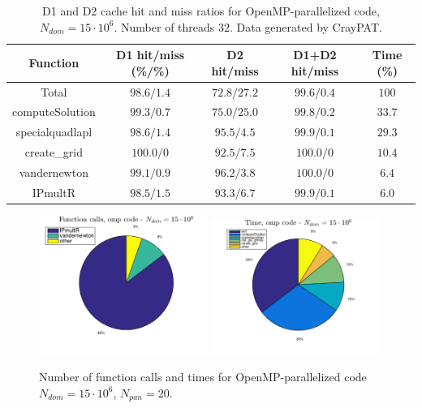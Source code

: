 \documentclass[a4paper,10pt]{article}
\begin{document}
\begin{table}[ht]
\begin{center}
    \begin{tabular}{ c | c | c | c | c }
        Function & D1 hit/miss (\%/\%) & D2 hit/miss & D1+D2 hit/miss & Time (\%) \\ \hline
        Total & $98.6/1.4$ & $72.8/27.2$ & $99.6/0.4$ & $100$ \\ 
        computeSolution & $99.3/0.7$ & $75.0/25.0$ & $99.8/0.2$ & $33.7$ \\
        specialquadlapl & $98.6/1.4$ & $95.5/4.5$ & $99.9/0.1$ & $29.3$ \\
        create\_grid & $100.0/0$ & $92.5/7.5$ & $100.0/0$ & $10.4$ \\
        vandernewton & $99.1/0.9$ & $96.2/3.8$ & $100.0/0$ & $6.4$ \\
        IPmultR & $98.5/1.5$ & $93.3/6.7$ & $99.9/0.1$ & $6.0$
    \end{tabular}
    \caption{D1 and D2 cache hit and miss ratios for OpenMP-parallelized code, $N_{dom} = 15\cdot10^6$. Number of threads $32$. Data generated by CrayPAT.}
    \label{tab:openmp_caches}
\end{center}
\end{table} 
\begin{figure}[ht]
    \begin{center}
        \includegraphics[width=0.49\textwidth]{Graphics/omp_strong_pie_calls.png}
        \includegraphics[width=0.49\textwidth]{Graphics/omp_strong_pie_time.png}
    \end{center}
    \caption{Number of function calls and times for OpenMP-parallelized code $N_{dom} = 15\cdot10^6$, $N_{pan} = 20$.}
    \label{fig:omp_strong_pie}
\end{figure}
\end{document}
